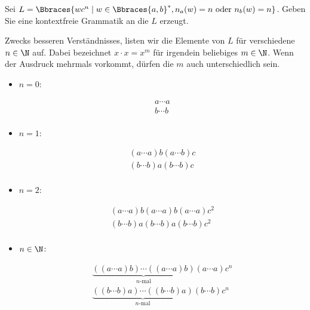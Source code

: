 
\begin{exercise}

Sei $L = \Bbraces{w c^n \mid w \in \Bbraces{a, b}^\ast, n_a(w) = n ~\text{oder}~ n_b(w) = n}$.
Geben Sie eine kontextfreie Grammatik an die $L$ erzeugt.

\end{exercise}


\begin{solution}

Zwecks besseren Verständnisses, listen wir die Elemente von $L$ für verschiedene $n \in \N$ auf.
Dabei bezeichnet $x \cdot x = x^m$ für irgendein beliebiges $m \in \N$.
Wenn der Ausdruck mehrmals vorkommt, dürfen die $m$ auch unterschiedlich sein.

\begin{itemize}

    \item $n = 0$:
    
    \begin{align*}
        a \cdots a \\
        b \cdots b \\
    \end{align*}

    \item $n = 1$:
    
    \begin{align*}
        (a \cdots a) b (a \cdots b) c \\
        (b \cdots b) a (b \cdots b) c \\
    \end{align*}

    \item $n = 2$:
    
    \begin{align*}
        (a \cdots a) b (a \cdots a) b (a \cdots a) c^2 \\
        (b \cdots b) a (b \cdots b) a (b \cdots b) c^2 \\
    \end{align*}

    \item $n \in \N$:
    
    \begin{align*}
        \underbrace
        {
            ((a \cdots a) b)
            \cdots
            ((a \cdots a) b)
        }_{
            \text{$n$-mal}
        }
        (a \cdots a)
        c^n \\
        \underbrace
        {
            ((b \cdots b) a)
            \cdots
            ((b \cdots b) a)
        }_{
            \text{$n$-mal}
        }
        (b \cdots b)
        c^n \\
    \end{align*}
\end{itemize}


\end{solution}
